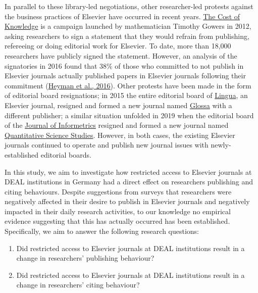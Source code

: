 \documentclass[
]{article}
\providecommand{\tightlist}{%
  \setlength{\itemsep}{0pt}\setlength{\parskip}{0pt}}
\begin{document}
In parallel to these library-led negotiations, other researcher-led protests against the business practices of Elsevier have occurred in recent years. \href{http://thecostofknowledge.com/}{The Cost of Knowledge} is a campaign launched by mathematician Timothy Gowers in 2012, asking researchers to sign a statement that they would refrain from publishing, refereeing or doing editorial work for Elsevier. To date, more than 18,000 researchers have publicly signed the statement. However, an analysis of the signatories in 2016 found that 38\% of those who committed to not publish in Elsevier journals actually published papers in Elsevier journals following their commitment (\href{https://doi.org/10.3389/frma.2016.00007}{Heyman et al., 2016}). Other protests have been made in the form of editorial board resignations; in 2015 the entire editorial board of \href{https://www.journals.elsevier.com/lingua}{Lingua}, an Elsevier journal, resigned and formed a new journal named \href{https://www.glossa-journal.org/}{Glossa} with a different publisher; a similar situation unfolded in 2019 when the editorial board of the \href{https://www.journals.elsevier.com/journal-of-informetrics}{Journal of Informetrics} resigned and formed a new journal named \href{https://direct.mit.edu/qss}{Quantitative Science Studies}. However, in both cases, the existing Elsevier journals continued to operate and publish new journal issues with newly-established editorial boards.

In this study, we aim to investigate how restricted access to Elsevier journals at DEAL institutions in Germany had a direct effect on researchers publishing and citing behaviours. Despite suggestions from surveys that researchers were negatively affected in their desire to publish in Elsevier journals and negatively impacted in their daily research activities, to our knowledge no empirical evidence suggesting that this has actually occurred has been established. Specifically, we aim to answer the following research questions:

\begin{enumerate}
\def\labelenumi{\arabic{enumi}.}
\tightlist
\item
  Did restricted access to Elsevier journals at DEAL institutions result in a change in researchers' publishing behaviour?
\item
  Did restricted access to Elsevier journals at DEAL institutions result in a change in researchers' citing behaviour?
\end{enumerate}
\end{document}
